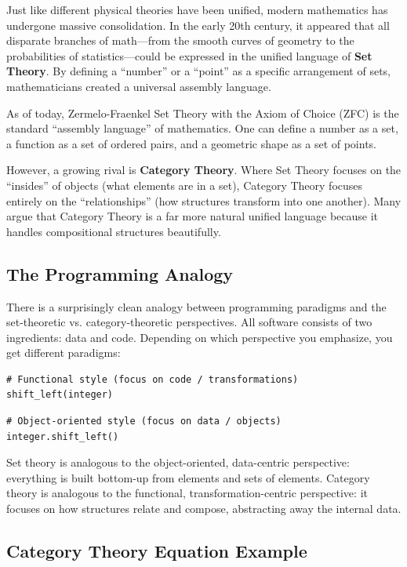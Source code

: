 Just like different physical theories have been unified, modern mathematics has undergone massive consolidation.
In the early 20th century, it appeared that all disparate branches of math---from the smooth curves of geometry to the probabilities of statistics---could be expressed in the unified language of \textbf{Set Theory}.
By defining a ``number'' or a ``point'' as a specific arrangement of sets, mathematicians created a universal assembly language.

As of today, Zermelo-Fraenkel Set Theory with the Axiom of Choice (ZFC) is the standard ``assembly language'' of mathematics.
One can define a number as a set, a function as a set of ordered pairs, and a geometric shape as a set of points.

However, a growing rival is \textbf{Category Theory}.
Where Set Theory focuses on the ``insides'' of objects (what elements are in a set), 
Category Theory focuses entirely on the ``relationships'' (how structures transform into one another).
Many argue that Category Theory is a far more natural unified language because it handles compositional structures beautifully.

\subsection*{The Programming Analogy}

There is a surprisingly clean analogy between programming paradigms and the set-theoretic vs. category-theoretic perspectives.
All software consists of two ingredients: data and code.
Depending on which perspective you emphasize, you get different paradigms:

\begin{verbatim}
# Functional style (focus on code / transformations)
shift_left(integer)
\end{verbatim}

\begin{verbatim}
# Object-oriented style (focus on data / objects)
integer.shift_left()
\end{verbatim}

Set theory is analogous to the object-oriented, data-centric perspective: everything is built bottom-up from elements and sets of elements.  
Category theory is analogous to the functional, transformation-centric perspective: it focuses on how structures relate and compose, abstracting away the internal data.

\subsection*{Category Theory Equation Example}

